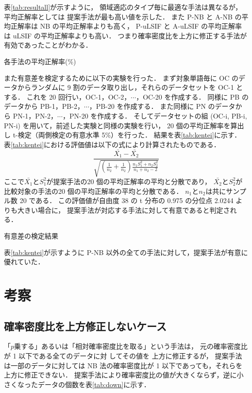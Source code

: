 \documentclass[japanese]{jnlp_1.4}
\begin{document}
\mbox{表\ref{tab:resultall}}が示すように，
領域適応のタイプ毎に最適な手法は異なるが，平均正解率としては
提案手法が最も高い値を示した．
また P-NB と A-NB の平均正解率は NB の平均正解率よりも高く，
P-uLSIF と A-uLSIF の平均正解率は uLSIF の平均正解率よりも高い．
つまり確率密度比を上方に修正する手法が有効であったことがわかる．

\begin{table}[b]
\caption{各手法の平均正解率(\%)}
\label{tab:resultall}

\end{table}

また有意差を検定するために以下の実験を行った．
まず対象単語毎に OC のデータからランダムに 9 割のデータ取り出し，それらのデータセットを OC-1 とする．
これを 20 回行い，OC-1，OC-2，$\cdots$，OC-20 を作成する．
同様に PB のデータから PB-1，PB-2，$\cdots$，PB-20 を作成する．
また同様に PN のデータから PN-1，PN-2，$\cdots$，PN-20 を作成する．
そしてデータセットの組 (OC-i, PB-i, PN-i) を用いて，前述した実験と同様の実験を行い，
20 個の平均正解率を算出し t-検定（両側検定の有意水準 5\%）を行った．
結果を\mbox{表\ref{tab:kentei}}に示す．
\mbox{表\ref{tab:kentei}}における評価値は以下の式により計算されたものである．
\[
\frac{\bar{X_1} - \bar{X_2}}{\sqrt{\left(\frac{1}{n_2} +\frac{1}{n_2}\right)\frac{n_1 S_1^2 + n_2 S_2^2 }{n_1 + n_2 - 2}}}
\]
ここで$\bar{X_1}$と$S_1^2$が提案手法の20 個の平均正解率の平均と分散であり，
$\bar{X_2}$と$S_2^2$が比較対象の手法の20 個の平均正解率の平均と分散である．
$n_1$と$n_2$は共にサンプル数 20 である．
この評価値が自由度 38 の t 分布の 0.975 の分位点 2.0244 よりも大きい場合に，
提案手法が対応する手法に対して有意であると判定される．

\begin{table}[b]
\caption{有意差の検定結果}
\label{tab:kentei}

\end{table}

\mbox{表\ref{tab:kentei}}が示すように P-NB 以外の全ての手法に対して，提案手法が有意に優れていた．


\section{考察}

\subsection{確率密度比を上方修正しないケース}

「$p$乗する」あるいは「相対確率密度比を取る」という手法は，
元の確率密度比が 1 以下である全てのデータに対
してその値を
上方に修正するが，
提案手法は一部のデータに対しては
NB 法の確率密度比が 1 以下であっても，それらを
上方に修正できない．
提案手法により確率密度比の値が大きくならず，逆に小さくなったデータの個数を\mbox{表\ref{tab:down}}に示す．
\end{document}
